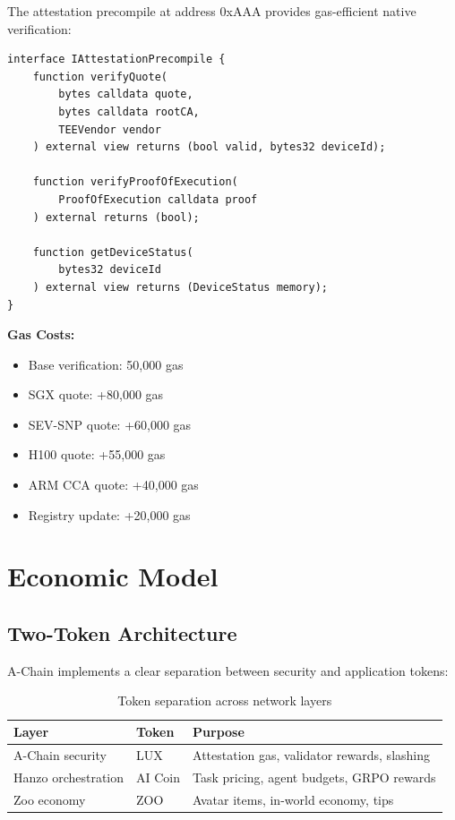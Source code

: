 \documentclass[11pt,a4paper]{article}
\begin{document}
The attestation precompile at address 0xAAA provides gas-efficient native verification:

\begin{lstlisting}[language=Solidity, basicstyle=\small\ttfamily]
interface IAttestationPrecompile {
    function verifyQuote(
        bytes calldata quote,
        bytes calldata rootCA,
        TEEVendor vendor
    ) external view returns (bool valid, bytes32 deviceId);
    
    function verifyProofOfExecution(
        ProofOfExecution calldata proof
    ) external returns (bool);
    
    function getDeviceStatus(
        bytes32 deviceId
    ) external view returns (DeviceStatus memory);
}
\end{lstlisting}

\textbf{Gas Costs:}
\begin{itemize}
\item Base verification: 50,000 gas
\item SGX quote: +80,000 gas
\item SEV-SNP quote: +60,000 gas
\item H100 quote: +55,000 gas
\item ARM CCA quote: +40,000 gas
\item Registry update: +20,000 gas
\end{itemize}

\section{Economic Model}

\subsection{Two-Token Architecture}

A-Chain implements a clear separation between security and application tokens:

\begin{table}[h]
\centering
\begin{tabular}{@{}lll@{}}
\toprule
\textbf{Layer} & \textbf{Token} & \textbf{Purpose} \\ \midrule
A-Chain security & LUX & Attestation gas, validator rewards, slashing \\
Hanzo orchestration & AI Coin & Task pricing, agent budgets, GRPO rewards \\
Zoo economy & ZOO & Avatar items, in-world economy, tips \\ \bottomrule
\end{tabular}
\caption{Token separation across network layers}
\end{table}
\end{document}
